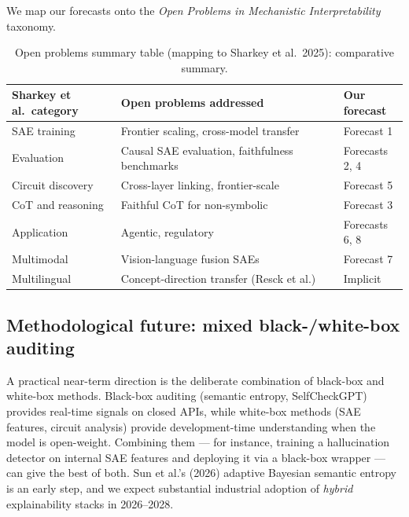 \documentclass{article}
\begin{document}
We map our forecasts onto the \emph{Open Problems in Mechanistic Interpretability} taxonomy.

\begin{table}[t]
\centering
\caption{Open problems summary table (mapping to Sharkey et al.~2025): comparative summary.}
\label{tab:open-problems-summary-table-mapping-to-sharkey-et-al-2025}
\begin{tabular}{>{\raggedright\arraybackslash}p{0.2771\linewidth}
  >{\raggedright\arraybackslash}p{0.5542\linewidth}
  >{\raggedright\arraybackslash}p{0.1687\linewidth}}
\toprule
Sharkey et al.~category & Open problems addressed & Our forecast \\
\midrule
SAE training & Frontier scaling, cross-model transfer & Forecast 1 \\
Evaluation & Causal SAE evaluation, faithfulness benchmarks & Forecasts 2, 4 \\
Circuit discovery & Cross-layer linking, frontier-scale & Forecast 5 \\
CoT and reasoning & Faithful CoT for non-symbolic & Forecast 3 \\
Application & Agentic, regulatory & Forecasts 6, 8 \\
Multimodal & Vision-language fusion SAEs & Forecast 7 \\
Multilingual & Concept-direction transfer (Resck et al.) & Implicit \\
\end{tabular}
\end{table}

\subsection{Methodological future: mixed black-/white-box auditing}\label{methodological-future-mixed-black-white-box-auditing}

A practical near-term direction is the deliberate combination of black-box and white-box methods. Black-box auditing (semantic entropy, SelfCheckGPT) provides real-time signals on closed APIs, while white-box methods (SAE features, circuit analysis) provide development-time understanding when the model is open-weight. Combining them --- for instance, training a hallucination detector on internal SAE features and deploying it via a black-box wrapper --- can give the best of both. Sun et al.'s (2026) adaptive Bayesian semantic entropy is an early step, and we expect substantial industrial adoption of \emph{hybrid} explainability stacks in 2026--2028.
\end{document}
